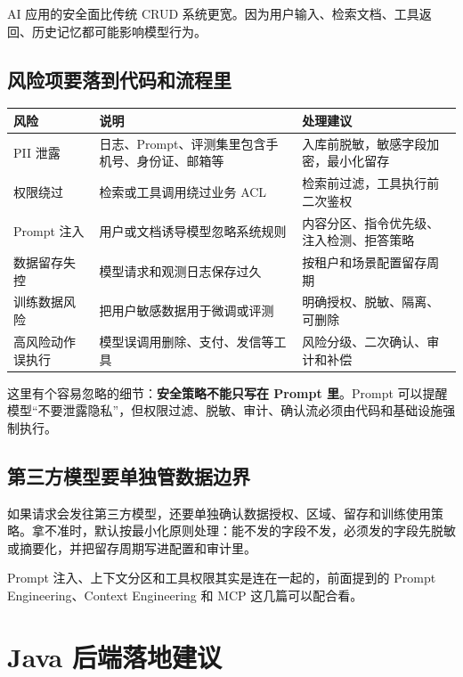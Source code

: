 \documentclass[10pt,a4paper]{ctexart}
\begin{document}
AI 应用的安全面比传统 CRUD 系统更宽。因为用户输入、检索文档、工具返回、历史记忆都可能影响模型行为。



\subsection{风险项要落到代码和流程里}

{\footnotesize
\begin{tabularx}{\textwidth}{|X|X|X|}
\hline
\textbf{风险} & \textbf{说明} & \textbf{处理建议} \\
\hline
PII 泄露 & 日志、Prompt、评测集里包含手机号、身份证、邮箱等 & 入库前脱敏，敏感字段加密，最小化留存 \\
\hline
权限绕过 & 检索或工具调用绕过业务 ACL & 检索前过滤，工具执行前二次鉴权 \\
\hline
Prompt 注入 & 用户或文档诱导模型忽略系统规则 & 内容分区、指令优先级、注入检测、拒答策略 \\
\hline
数据留存失控 & 模型请求和观测日志保存过久 & 按租户和场景配置留存周期 \\
\hline
训练数据风险 & 把用户敏感数据用于微调或评测 & 明确授权、脱敏、隔离、可删除 \\
\hline
高风险动作误执行 & 模型误调用删除、支付、发信等工具 & 风险分级、二次确认、审计和补偿 \\
\hline
\end{tabularx}
}



这里有个容易忽略的细节：\textbf{安全策略不能只写在 Prompt 里}。Prompt 可以提醒模型“不要泄露隐私”，但权限过滤、脱敏、审计、确认流必须由代码和基础设施强制执行。



\subsection{第三方模型要单独管数据边界}


如果请求会发往第三方模型，还要单独确认数据授权、区域、留存和训练使用策略。拿不准时，默认按最小化原则处理：能不发的字段不发，必须发的字段先脱敏或摘要化，并把留存周期写进配置和审计里。



Prompt 注入、上下文分区和工具权限其实是连在一起的，前面提到的 Prompt Engineering、Context Engineering 和 MCP 这几篇可以配合看。



\section{Java 后端落地建议}
\end{document}

